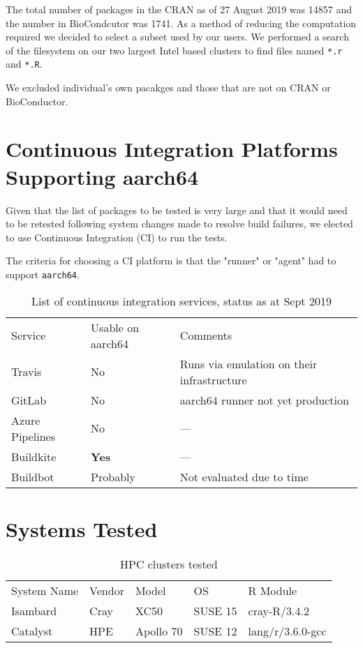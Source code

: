 The total number of packages in the \textsc{CRAN} as of 27 August 2019 was
14857 and the number in BioCondcutor was 1741. As a method of reducing the
computation required we decided to select a subset used by our users. We
performed a search of the filesystem on our two largest Intel based clusters
to find files named \texttt{*.r} and \texttt{*.R}.

We excluded individual's own pacakges and those that are not on
\textsc{CRAN} or BioConductor.

\section{Continuous Integration Platforms Supporting aarch64}

Given that the list of packages to be tested is very large and that it would need to be retested following system changes made to resolve build failures, we elected to use Continuous Integration (\textsc{CI}) to run the tests.

The criteria for choosing a \textsc{CI} platform is that the "runner" or "agent" had to support \texttt{aarch64}.

\begin{table}[htbp]
\begin{tabular}{lll}
\cline{1-3}
Service & Usable on aarch64 & Comments\\ \cline{1-3}
Travis & No & Runs via emulation on their infrastructure\\
GitLab & No & aarch64 runner not yet production\\
Azure Pipelines & No & ---\\
Buildkite & \textbf{Yes} & --- \\
Buildbot & Probably & Not evaluated due to time \\ \cline{1-3}
\end{tabular}
\caption{List of continuous integration services, status as at Sept 2019}
\label{tab:ci-services}
\end{table}

\section{Systems Tested}

\begin{table}[h]
\begin{tabular}{lllll}
\cline{1-5}
System Name & Vendor & Model & OS & R Module \\ \cline{1-5}
Isambard & Cray & XC50 & SUSE 15 & cray-R/3.4.2 \\
Catalyst & HPE & Apollo 70 & SUSE 12 & lang/r/3.6.0-gcc \\ \cline{1-5}
\end{tabular}
\caption{HPC clusters tested }
\label{tab:systems}
\end{table}


